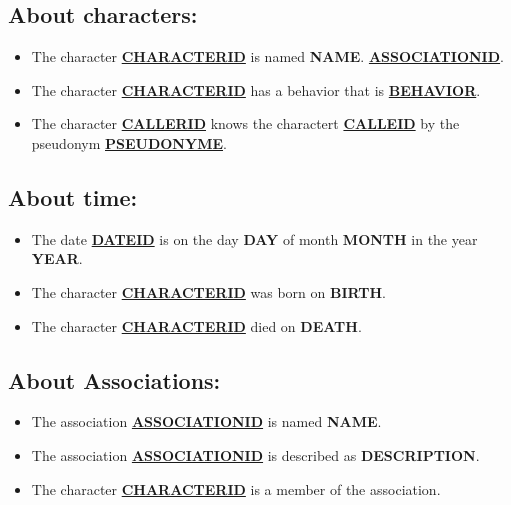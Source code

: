 \documentclass[a4paper ,12pt,french]{article}
\begin{document}
\subsection*{About characters:}
\begin{itemize}
\item The character \underline{\textbf{CHARACTERID}} is named \textbf{NAME}. \underline{\textbf{ASSOCIATIONID}}.
\item The character \underline{\textbf{CHARACTERID}} has a behavior that is \underline{\textbf{BEHAVIOR}}.
\item The character \underline{\textbf{CALLERID}} knows the charactert \underline{\textbf{CALLEID}} by the pseudonym \underline{\textbf{PSEUDONYME}}.
\end{itemize}

\subsection*{About time:}
\begin{itemize}
\item The date \underline{\textbf{DATEID}} is on the day \textbf{DAY} of month \textbf{MONTH} in the year \textbf{YEAR}.
\item The character \underline{\textbf{CHARACTERID}} was born on \textbf{BIRTH}.
\item The character \underline{\textbf{CHARACTERID}} died on \textbf{DEATH}.
\end{itemize}

\subsection*{About Associations:}
\begin{itemize}
\item The association \underline{\textbf{ASSOCIATIONID}} is named \textbf{NAME}.
\item The association \underline{\textbf{ASSOCIATIONID}} is described as \textbf{DESCRIPTION}.
\item The character \underline{\textbf{CHARACTERID}} is a member of the association.
\end{itemize}
\end{document}
